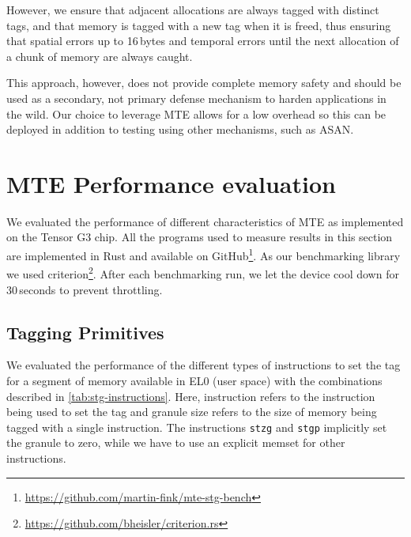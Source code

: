 However, we ensure that adjacent allocations are always tagged with distinct tags, and that memory is tagged with a new tag when it is freed, thus ensuring that spatial errors up to 16\,bytes and temporal errors until the next allocation of a chunk of memory are always caught.

This approach, however, does not provide complete memory safety and should be used as a secondary, not primary defense mechanism to harden applications in the wild.
Our choice to leverage \ac{MTE} allows for a low overhead so this can be deployed in addition to testing using other mechanisms, such as \ac{ASAN}.


\section{MTE Performance evaluation}
\label{sec:mte-performance-evaluation}

We evaluated the performance of different characteristics of \ac{MTE} as implemented on the Tensor G3 chip.
All the programs used to measure results in this section are implemented in Rust and available on GitHub\footnote{\url{https://github.com/martin-fink/mte-stg-bench}}.
As our benchmarking library we used criterion\footnote{\url{https://github.com/bheisler/criterion.rs}}.
After each benchmarking run, we let the device cool down for 30\,seconds to prevent throttling.

\subsection{Tagging Primitives}
\label{subsec:tagging-primitives}

We evaluated the performance of the different types of instructions to set the tag for a segment of memory available in EL0 (user space) with the combinations described in \cref{tab:stg-instructions}.
Here, instruction refers to the instruction being used to set the tag and granule size refers to the size of memory being tagged with a single instruction.
The instructions \texttt{stzg} and \texttt{stgp} implicitly set the granule to zero, while we have to use an explicit memset for other instructions.


